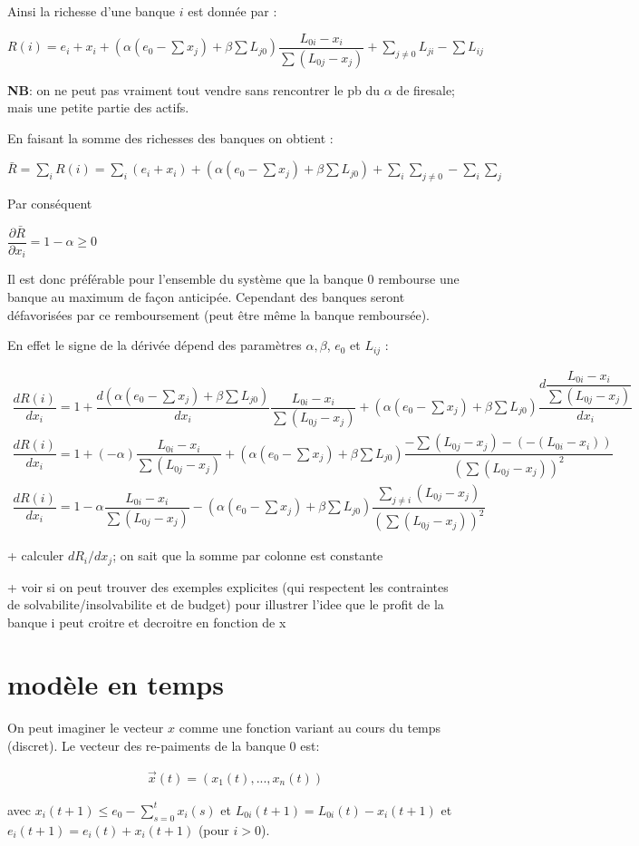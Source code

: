 \documentclass{article}
\def\AR#1{
\[
\begin{array}{llllllll}
#1
\end{array}
\]
}
\begin{document}
Ainsi la richesse d'une banque $i$ est donnée par :

$R(i)= e_i + x_i + (\alpha (e_0 - \sum x_j) + \beta \sum L_{j0}) \dfrac{L_{0i}- x_i}{\sum (L_{0j} - x_j)} + \sum_{j \neq 0} L_{ji} - \sum L_{ij}$

\textbf{NB}: on ne peut pas vraiment tout vendre sans rencontrer le pb du $\alpha$ de firesale; mais une petite partie des actifs.

En faisant la somme des richesses des banques on obtient :

$\bar R = \sum_i R(i) = \sum_i (e_i + x_i) +  (\alpha (e_0 - \sum x_j) + \beta \sum L_{j0}) + \sum_i \sum_{j \neq 0} - \sum_i \sum_j$
  
Par conséquent 

$\dfrac{\partial \bar R}{\partial x_i} = 1 - \alpha\geq0$

Il est donc préférable pour l'ensemble du système que la banque $0$ rembourse une banque au maximum de façon anticipée. Cependant des banques seront défavorisées par ce remboursement (peut être même la banque remboursée). 

En effet le signe de la dérivée dépend des paramètres $\alpha, \beta$, $e_0$ et $L_{ij}$ : 
\AR{
\dfrac
{dR(i)}
{dx_i} =
1 + 
\dfrac
{d(\alpha (e_0 - \sum x_j) + \beta \sum L_{j0})}
{dx_i}
 \dfrac
{L_{0i}- x_i}
{\sum (L_{0j} - x_j)} + 
(\alpha (e_0 - \sum x_j) + \beta \sum L_{j0}) 
\dfrac
{d\dfrac{L_{0i}- x_i}{\sum (L_{0j} - x_j)}}
{dx_i}
\\
\dfrac
{dR(i)}
{dx_i}  =
1 + (-\alpha)  
\dfrac
{L_{0i}- x_i}
{\sum (L_{0j} - x_j)} +
(\alpha (e_0 - \sum x_j) + \beta \sum L_{j0}) 
\dfrac
{-\sum (L_{0j} - x_j) - (- (L_{0i}-x_i))}
{(\sum (L_{0j} - x_j))^2} 
\\
\dfrac
{dR(i)}
{dx_i} =
1 -\alpha  
\dfrac
{L_{0i}- x_i}
{\sum (L_{0j} - x_j)} - 
(\alpha (e_0 - \sum x_j) + \beta \sum L_{j0}) 
\dfrac
{\sum_{j\neq i} (L_{0j} - x_j)}
{(\sum (L_{0j} - x_j))^2}
}

+ calculer $dR_i/dx_j$; on sait que la somme par colonne est constante

+ voir si on peut trouver des exemples explicites (qui respectent les contraintes de solvabilite/insolvabilite
et de budget) pour illustrer l'idee que le profit de la banque i peut croitre et decroitre en fonction de x

\section{modèle en temps}
On peut imaginer le vecteur $x$ comme une fonction variant au cours du temps (discret). Le vecteur des re-paiments de la banque 0 est:
\AR{
\vec x(t) = (x_1(t), ..., x_n(t))
}
avec 
$x_i(t+1) \leq e_0 - \sum_{s=0}^{t}x_i(s)$ et $L_{0i}(t+1)=L_{0i}(t) - x_i(t+1)$ et
$e_i(t+1) = e_i(t) +x_i(t+1)$ (pour $i>0$).
\end{document}
